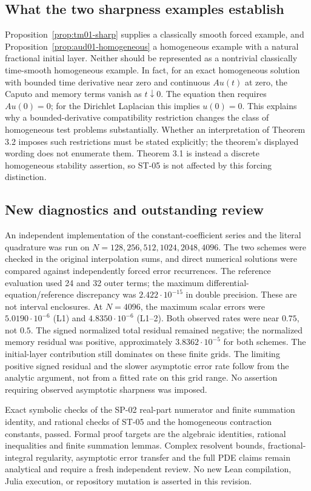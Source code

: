 \documentclass[11pt,a4paper]{amsart}
\theoremstyle{remark}
\theoremstyle{plain}
\theoremstyle{remark}
\numberwithin{equation}{section}
\begin{document}
\subsection{What the two sharpness examples establish}
Proposition~\ref{prop:tm01-sharp} supplies a classically smooth forced example, and Proposition~\ref{prop:aud01-homogeneous} a homogeneous example with a natural fractional initial layer. Neither should be represented as a nontrivial classically time-smooth homogeneous example. In fact, for an exact homogeneous solution with bounded time derivative near zero and continuous $Au(t)$ at zero, the Caputo and memory terms vanish as $t\downarrow0$. The equation then requires $Au(0)=0$; for the Dirichlet Laplacian this implies $u(0)=0$. This explains why a bounded-derivative compatibility restriction changes the class of homogeneous test problems substantially. Whether an interpretation of Theorem 3.2 imposes such restrictions must be stated explicitly; the theorem's displayed wording does not enumerate them. Theorem 3.1 is instead a discrete homogeneous stability assertion, so ST-05 is not affected by this forcing distinction.

\subsection{New diagnostics and outstanding review}
An independent implementation of the constant-coefficient series and the literal quadrature was run on $N=128,256,512,1024,2048,4096$. The two schemes were checked in the original interpolation sums, and direct numerical solutions were compared against independently forced error recurrences. The reference evaluation used 24 and 32 outer terms; the maximum differential-equation/reference discrepancy was $2.422\cdot10^{-15}$ in double precision. These are not interval enclosures. At $N=4096$, the maximum scalar errors were $5.0190\cdot10^{-6}$ (L1) and $4.8350\cdot10^{-6}$ (L1--2). Both observed rates were near $0.75$, not $0.5$. The signed normalized total residual remained negative; the normalized memory residual was positive, approximately $3.8362\cdot10^{-5}$ for both schemes. The initial-layer contribution still dominates on these finite grids. The limiting positive signed residual and the slower asymptotic error rate follow from the analytic argument, not from a fitted rate on this grid range. No assertion requiring observed asymptotic sharpness was imposed.

Exact symbolic checks of the SP-02 real-part numerator and finite summation identity, and rational checks of ST-05 and the homogeneous contraction constants, passed. Formal proof targets are the algebraic identities, rational inequalities and finite summation lemmas. Complex resolvent bounds, fractional-integral regularity, asymptotic error transfer and the full PDE claims remain analytical and require a fresh independent review. No new Lean compilation, Julia execution, or repository mutation is asserted in this revision.
\end{document}
